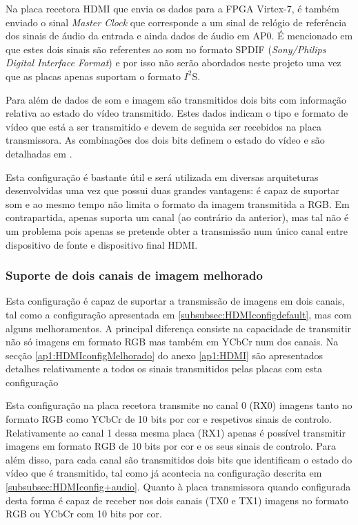 Na placa recetora HDMI que envia os dados para a FPGA Virtex-7, é também enviado o sinal \textit{Master Clock} que corresponde a um sinal de relógio de referência dos sinais de áudio da entrada e ainda dados de áudio em AP0. É mencionado em \cite{R016} que estes dois sinais são referentes ao som no formato SPDIF (\textit{Sony/Philips Digital Interface Format}) e por isso não serão abordados neste projeto uma vez que as placas apenas suportam o formato $I^{2}$S.

Para além de dados de som e imagem são transmitidos dois bits com informação relativa ao estado do vídeo transmitido. Estes dados indicam o tipo e formato de vídeo que está a ser transmitido e devem de seguida ser recebidos na placa transmissora. As combinações dos dois bits definem o estado do vídeo e são detalhadas em \cite{R014}.

Esta configuração é bastante útil e será utilizada em diversas arquiteturas desenvolvidas uma vez que possui duas grandes vantagens: é capaz de suportar som e ao mesmo tempo não limita o formato da imagem transmitida a RGB. Em contrapartida, apenas suporta um canal (ao contrário da anterior), mas tal não é um problema pois apenas se pretende obter a transmissão num único canal entre dispositivo de fonte e dispositivo final HDMI. 


\subsubsection{Suporte de dois canais de imagem melhorado} \label{subsubsec:HDMIconfigMelhorado}


Esta configuração é capaz de suportar a transmissão de imagens em dois canais, tal como a configuração apresentada em \ref{subsubsec:HDMIconfigdefault}, mas com alguns melhoramentos. A principal diferença consiste na capacidade de transmitir não só imagens em formato RGB mas também em YCbCr num dos canais. Na secção \ref{ap1:HDMIconfigMelhorado} do anexo \ref{ap1:HDMI} são apresentados detalhes relativamente a todos os sinais transmitidos pelas placas com esta configuração

Esta configuração na placa recetora transmite no canal 0 (RX0) imagens tanto no formato RGB como YCbCr de 10 bits por cor e respetivos sinais de controlo. Relativamente ao canal 1 dessa mesma placa (RX1) apenas é possível transmitir imagens em formato RGB de 10 bits por cor e os seus sinais de controlo. Para além disso, para cada canal são transmitidos dois bits que identificam o estado do vídeo que é transmitido, tal como já acontecia na configuração descrita em \ref{subsubsec:HDMIconfig+audio}. Quanto à placa transmissora quando configurada desta forma é capaz de receber nos dois canais (TX0 e TX1) imagens no formato RGB ou YCbCr com 10 bits por cor. 

